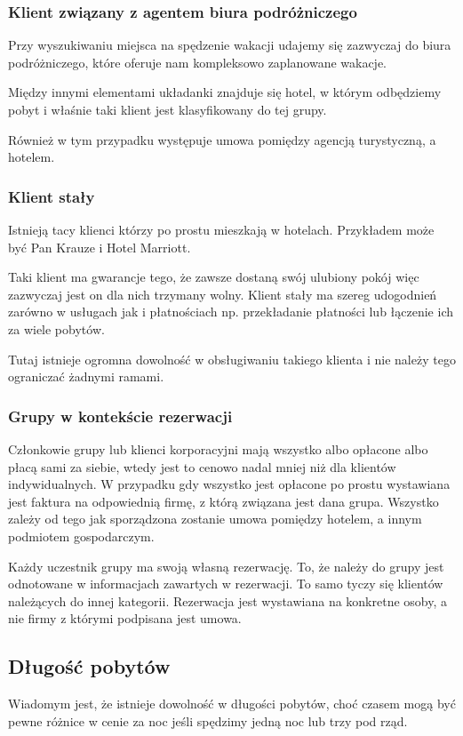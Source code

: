 \documentclass[12pt, a4paper]{article}
\begin{document}
\subsubsection{Klient związany z agentem biura podróżniczego}
Przy wyszukiwaniu miejsca na spędzenie wakacji udajemy się zazwyczaj do biura
podróżniczego, które oferuje nam kompleksowo zaplanowane wakacje.

Między innymi elementami układanki znajduje się hotel, w którym odbędziemy pobyt
i właśnie taki klient jest klasyfikowany do tej grupy.

Również w tym przypadku występuje umowa pomiędzy agencją turystyczną, a hotelem.

\subsubsection{Klient stały}
Istnieją tacy klienci którzy po prostu mieszkają w hotelach. Przykładem może być
Pan Krauze i Hotel Marriott.  

Taki klient ma gwarancje tego, że zawsze dostaną
swój ulubiony pokój więc zazwyczaj jest on dla nich trzymany wolny. Klient stały
ma szereg udogodnień zarówno w usługach jak i płatnościach np. przekładanie
płatności lub łączenie ich za wiele pobytów.

Tutaj istnieje ogromna dowolność w obsługiwaniu takiego klienta i nie należy
tego ograniczać żadnymi ramami.

\subsubsection{Grupy w kontekście rezerwacji}
Członkowie grupy lub klienci korporacyjni mają wszystko albo opłacone 
albo płacą sami za siebie, wtedy jest to cenowo nadal mniej niż dla klientów 
indywidualnych. W przypadku gdy wszystko jest opłacone po prostu
wystawiana jest faktura na odpowiednią firmę, z którą związana jest dana
grupa. Wszystko zależy od tego jak sporządzona zostanie umowa pomiędzy hotelem,
a innym podmiotem gospodarczym.

Każdy uczestnik grupy ma swoją własną rezerwację. To, że należy do grupy jest 
odnotowane w informacjach zawartych w rezerwacji. To samo tyczy się klientów 
należących do innej kategorii. Rezerwacja jest wystawiana na konkretne osoby, 
a nie firmy z którymi podpisana jest umowa.

\subsection{Długość pobytów}
Wiadomym jest, że istnieje dowolność w długości pobytów, choć czasem mogą być
pewne różnice w cenie za noc jeśli spędzimy jedną noc lub trzy pod rząd.
\end{document}
